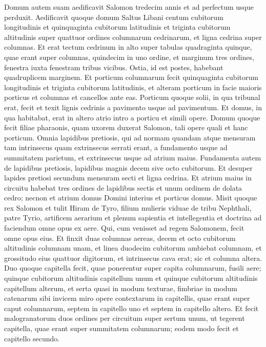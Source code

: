 \begin{biblechapter}  
\verse Domum autem suam aedificavit Salomon tredecim annis et ad perfectum usque perduxit. 
\verse Aedificavit quoque domum Saltus Libani centum cubitorum longitudinis et quinquaginta cubitorum latitudinis et triginta cubitorum altitudinis super quattuor ordines columnarum cedrinarum, et ligna cedrina super columnas. 
\verse Et erat tectum cedrinum in alto super tabulas quadraginta quinque, quae erant super columnas, quindecim in uno ordine, 
\verse et marginum tres ordines, fenestra iuxta fenestram tribus vicibus. 
\verse Ostia, id est postes, habebant quadruplicem marginem. 
\verse Et porticum columnarum fecit quinquaginta cubitorum longitudinis et triginta cubitorum latitudinis, et alteram porticum in facie maioris porticus et columnas et cancellos ante eas.  
\verse Porticum quoque solii, in qua tribunal erat, fecit et texit lignis cedrinis a pavimento usque ad pavimentum. 
\verse Et domus, in qua habitabat, erat in altero atrio intro a porticu et simili opere. Domum quoque fecit filiae pharaonis, quam uxorem duxerat Salomon, tali opere quali et hanc porticum. 
\verse Omnia lapidibus pretiosis, qui ad normam quandam atque mensuram tam intrinsecus quam extrinsecus serrati erant, a fundamento usque ad summitatem parietum, et extrinsecus usque ad atrium maius. 
\verse Fundamenta autem de lapidibus pretiosis, lapidibus magnis decem sive octo cubitorum. 
\verse Et desuper lapides pretiosi secundum mensuram secti et ligna cedrina. 
\verse Et atrium maius in circuitu habebat tres ordines de lapidibus sectis et unum ordinem de dolata cedro; necnon et atrium domus Domini interius et porticus domus. 
\verse Misit quoque rex Salomon et tulit Hiram de Tyro, 
\verse filium mulieris viduae de tribu Nephthali, patre Tyrio, artificem aerarium et plenum sapientia et intellegentia et doctrina ad faciendum omne opus ex aere. Qui, cum venisset ad regem Salomonem, fecit omne opus eius. 
\verse Et finxit duas columnas aereas, decem et octo cubitorum altitudinis columnam unam, et linea duodecim cubitorum ambiebat columnam, et grossitudo eius quattuor digitorum, et intrinsecus cava erat; sic et columna altera. 
\verse Duo quoque capitella fecit, quae ponerentur super capita columnarum, fusili aere; quinque cubitorum altitudinis capitellum unum et quinque cubitorum altitudinis capitellum alterum, 
\verse et serta quasi in modum texturae, fimbriae in modum catenarum sibi invicem miro opere contextarum in capitellis, quae erant super caput columnarum, septem in capitello uno et septem in capitello altero. 
\verse Et fecit malogranatorum duos ordines per circuitum super sertum unum, ut tegerent capitella, quae erant super summitatem columnarum; eodem modo fecit et capitello secundo. 

\end{biblechapter}
